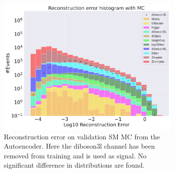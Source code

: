 \begin{figure}[h!]
\begin{subfigure}{.8\textwidth}
        \includegraphics[width=\textwidth]{Figures/AE_testing/small/b_data_recon_big_rm3_feats_sig_diboson3L.pdf}
        \caption{Reconstruction error on validation SM MC from the Autoencoder. Here the diboson3l channel has been removed from training and 
        is used as signal. No significant difference in distributions are found.}
        \label{fig:ae_small_diboson3l}
    \end{subfigure}
    \hfill        
    \caption{ }
    \label{fig:ae_small_channel1}
\end{figure}


